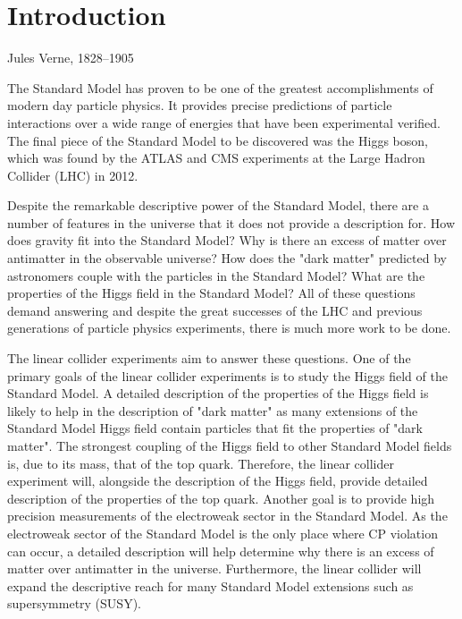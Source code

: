 \chapter{Introduction}
\label{chap:introduction}

{Jules Verne, 1828--1905}


The Standard Model has proven to be one of the greatest accomplishments of modern day particle physics.  It provides precise predictions of particle interactions over a wide range of energies that have been experimental verified.  The final piece of the Standard Model to be discovered was the Higgs boson, which was found by the ATLAS \cite{Aad:2012tfa} and CMS \cite{Chatrchyan:2012xdj} experiments at the Large Hadron Collider (LHC) in 2012.  

Despite the remarkable descriptive power of the Standard Model, there are a number of features in the universe that it does not provide a description for.  How does gravity fit into the Standard Model?  Why is there an excess of matter over antimatter in the observable universe?  How does the "dark matter" predicted by astronomers couple with the particles in the Standard Model?  What are the properties of the Higgs field in the Standard Model?  All of these questions demand answering and despite the great successes of the LHC and previous generations of particle physics experiments, there is much more work to be done. 

The linear collider experiments aim to answer these questions.  One of the primary goals of the linear collider experiments is to study the Higgs field of the Standard Model.  A detailed description of the properties of the Higgs field is likely to help in the description of "dark matter" as many extensions of the Standard Model Higgs field contain particles that fit the properties of "dark matter".  The strongest coupling of the Higgs field to other Standard Model fields is, due to its mass, that of the top quark.  Therefore, the linear collider experiment will, alongside the description of the Higgs field, provide detailed description of the properties of the top quark.  Another goal is to provide high precision measurements of the electroweak sector in the Standard Model.  As the electroweak sector of the Standard Model is the only place where CP violation can occur, a detailed description will help determine why there is an excess of matter over antimatter in the universe.  Furthermore, the linear collider will expand the descriptive reach for many Standard Model extensions such as supersymmetry (SUSY).

